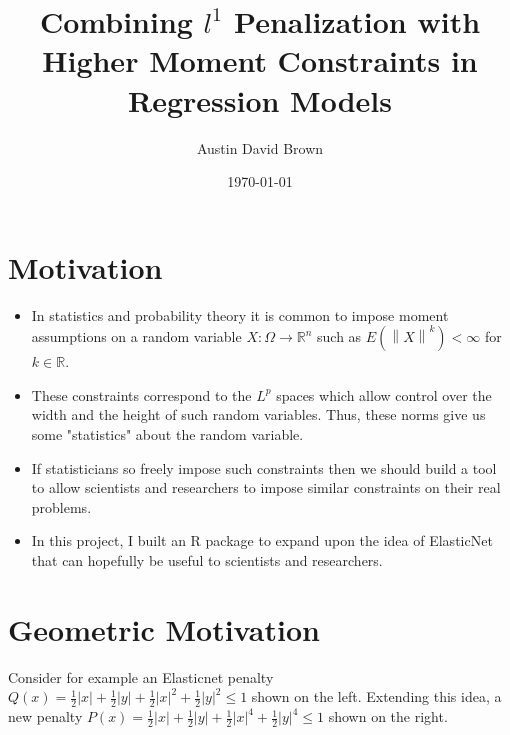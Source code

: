 \documentclass[10pt, reqno]{article}
\numberwithin{equation}{section}
\newcommand{\norm}[1]{\left\lVert#1\right\rVert}
\newcommand{\R}{\mathbb{R}}
\begin{document}
\setlength{\footskip}{-1cm}
 

\title{Combining $l^1$ Penalization with Higher Moment Constraints in Regression Models}
\author{Austin David Brown}
\date{\today}

\maketitle

\newpage
\section*{Motivation}

\begin{itemize}

\item In statistics and probability theory it is common to impose moment assumptions on a random variable $X : \Omega \to \R^n$ such as $E(\norm{X}^k) < \infty$ for $k \in \R$.

\item These constraints correspond to the $L^p$ spaces which allow control over the width and the height of such random variables.
Thus, these norms give us some "statistics" about the random variable.

\item If statisticians so freely impose such constraints then we should build a tool to allow scientists and researchers to impose similar constraints on their real problems.

\item  In this project, I built an R package to expand upon the idea of ElasticNet \cite{elasticnet} that can hopefully be useful to scientists and researchers.

\end{itemize}

\newpage
\section*{Geometric Motivation}
Consider for example an Elasticnet \cite{elasticnet} penalty $Q(x) = \frac{1}{2} |x| + \frac{1}{2} |y| + \frac{1}{2} |x|^2 + \frac{1}{2} |y|^2 \le 1$
shown on the left. Extending this idea, a new penalty $P(x) = \frac{1}{2} |x| + \frac{1}{2} |y| + \frac{1}{2} |x|^4 + \frac{1}{2} |y|^4 \le 1$ shown on the right.
\end{document}
